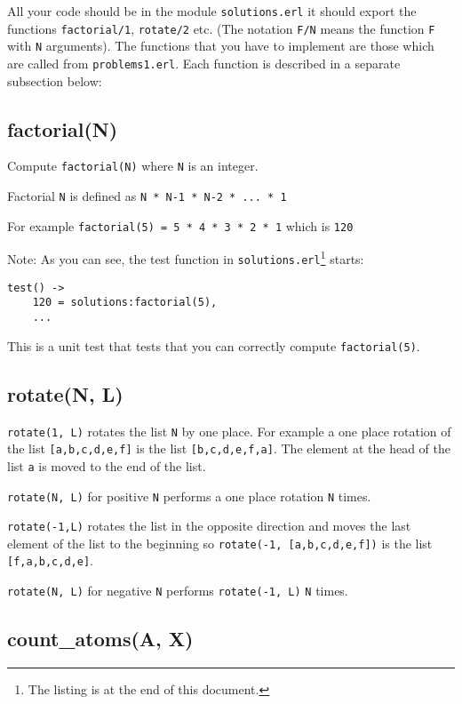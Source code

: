 \documentclass[12pt]{hitec}
\begin{document}
All your code should be in the module \verb+solutions.erl+ it
should export the functions \verb+factorial/1+, \verb+rotate/2+ etc.
(The notation \verb+F/N+ means the function \verb+F+ with \verb+N+
arguments).  The functions that you have to implement are those which
are called from \verb+problems1.erl+. Each function is described
in a separate subsection below:

\subsection{factorial(N)}

Compute \verb+factorial(N)+ where \verb+N+ is an integer.

Factorial \verb+N+ is defined as \verb+N * N-1 * N-2 * ... * 1+

For example \verb+factorial(5) = 5 * 4 * 3 * 2 * 1+ which is
\verb+120+

Note: As you can see, the test function in 
\verb+solutions.erl+\footnote{The listing is at the end of this document.} 
starts:

\begin{Verbatim}[frame=single]
test() ->
    120 = solutions:factorial(5),
    ...
\end{Verbatim}

This is a unit test that tests that you can correctly compute
\verb+factorial(5)+.

\subsection{rotate(N, L)}

\verb+rotate(1, L)+ rotates the list \verb+N+ by one place.
For example a one place rotation of the list \verb+[a,b,c,d,e,f]+ is the list
\verb+[b,c,d,e,f,a]+. The element at the head of the list \verb+a+ is moved
to the end of the list.

\verb+rotate(N, L)+ for positive \verb+N+ performs a one place rotation \verb+N+ times.

\verb+rotate(-1,L)+ rotates the list in the opposite direction and moves the
last element of the list to the beginning 
so  \verb+rotate(-1, [a,b,c,d,e,f])+ is the list
\verb+[f,a,b,c,d,e]+.

\verb+rotate(N, L)+ for negative \verb+N+ performs \verb+rotate(-1, L)+ \verb+N+ times.

\subsection{count\_atoms(A, X)}
\end{document}

